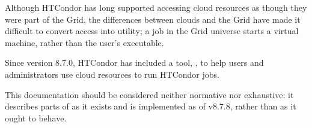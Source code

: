 Although HTCondor has long supported accessing cloud resources as though they
were part of the Grid, the differences between clouds and the Grid have
made it difficult to convert access into utility; a job in the Grid universe
starts a virtual machine, rather than the user's executable.

Since version 8.7.0, HTCondor has included a tool, , to help
users and administrators use cloud resources to run HTCondor jobs.

This documentation should be considered neither normative nor exhaustive:
it describes parts of  as it exists and is implemented
as of v8.7.8, rather than as it ought to behave.








